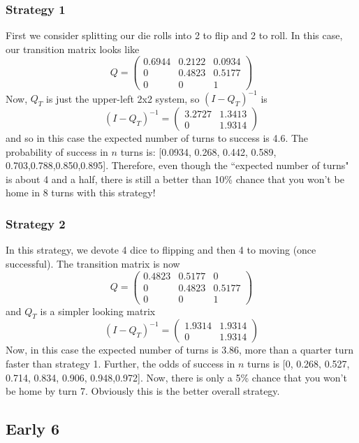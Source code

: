 \documentclass[letterpaper,11pt]{article}
\begin{document}
\subsubsection{Strategy 1}
First we consider splitting our die rolls into 2 to flip and 2 to roll.  In
this case, our transition matrix looks like 
\[
   Q = \left(\begin{array}{ccc}
      0.6944 & 0.2122 & 0.0934 \\
      0 & 0.4823 & 0.5177 \\
      0 & 0 & 1
      \end{array} \right)
\]
Now, $Q_T$ is just the upper-left 2x2 system, so $(I-Q_T)^{-1}$ is 
\[
   (I-Q_T)^{-1} = \left(\begin{array}{cc}
     3.2727 & 1.3413 \\
     0 & 1.9314
   \end{array} \right)
\]
and so in this case the expected number of turns to success is 4.6.  The
probability of success in $n$ turns is: [0.0934, 0.268, 0.442, 0.589,
0.703,0.788,0.850,0.895].  Therefore, even though the ``expected number of
turns" is about 4 and a half, there is still a better than 10\% chance that
you won't be home in 8 turns with this strategy!

\subsubsection{Strategy 2}
In this strategy, we devote 4 dice to flipping and then 4 to moving (once
successful).  The transition matrix is now
\[
   Q = \left(\begin{array}{ccc}
      0.4823 & 0.5177 & 0 \\
      0 & 0.4823 & 0.5177 \\
      0 & 0 & 1
      \end{array} \right)
\]
and $Q_T$ is a simpler looking matrix
\[
   (I-Q_T)^{-1} = \left(\begin{array}{cc}
     1.9314 & 1.9314 \\
     0 & 1.9314
   \end{array} \right)
\]
Now, in this case the expected number of turns is 3.86, more than a quarter
turn faster than strategy 1.  Further, the odds of success in $n$ turns is
[0, 0.268, 0.527, 0.714, 0.834, 0.906, 0.948,0.972].  Now, there is only a 5\%
chance that you won't be home by turn 7.  Obviously this is the better
overall strategy.

\subsection{Early 6}
\end{document}
